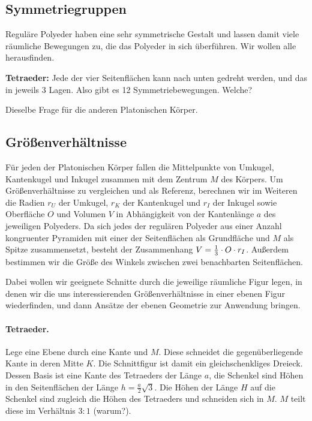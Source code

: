 \documentclass[11pt]{article}
\begin{document}
\subsection*{Symmetriegruppen}

Reguläre Polyeder haben eine sehr symmetrische Gestalt und lassen damit viele
räumliche Bewegungen zu, die das Polyeder in sich überführen. Wir wollen alle
herausfinden.  

\textbf{Tetraeder:} Jede der vier Seitenflächen kann nach unten gedreht
werden, und das in jeweils 3 Lagen. Also gibt es 12 Symmetriebewegungen.
Welche?

Dieselbe Frage für die anderen Platonischen Körper.

\subsection*{Größenverhältnisse}

Für jeden der Platonischen Körper fallen die Mittelpunkte von Umkugel,
Kantenkugel und Inkugel zusammen mit dem Zentrum $M$ des Körpers.  Um
Größenverhältnisse zu vergleichen und als Referenz, berechnen wir im Weiteren
die Radien $r_U$ der Umkugel, $r_K$ der Kantenkugel und $r_I$ der Inkugel
sowie Oberfläche $O$ und Volumen $V$ in Abhängigkeit von der Kantenlänge $a$
des jeweiligen Polyeders.  Da sich jedes der regulären Polyeder aus einer
Anzahl kongruenter Pyramiden mit einer der Seitenflächen als Grundfläche und
$M$ als Spitze zusammensetzt, besteht der Zusammenhang $V=\frac13\cdot O\cdot r_I$.
Außerdem bestimmen wir die Größe des Winkels zwischen zwei benachbarten
Seitenflächen.

Dabei wollen wir geeignete Schnitte durch die jeweilige räumliche Figur legen,
in denen wir die uns interessierenden Größenverhältnisse in einer ebenen Figur
wiederfinden, und dann Ansätze der ebenen Geometrie zur Anwendung bringen.
  
\paragraph{Tetraeder.}
Lege eine Ebene durch eine Kante und $M$. Diese schneidet die
gegenüberliegende Kante in deren Mitte $K$. Die Schnittfigur ist damit ein
gleichschenkliges Dreieck. Dessen Basis ist eine Kante des Tetraeders der
Länge $a$, die Schenkel sind Höhen in den Seitenflächen der Länge
$h=\frac{a}{2}\sqrt{3}$.  Die Höhen der Länge $H$ auf die Schenkel sind
zugleich die Höhen des Tetraeders und schneiden sich in $M$.  $M$ teilt diese
im Verhältnis $3:1$ (warum?). 
\end{document}
